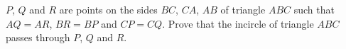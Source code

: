 $P$, $Q$ and $R$ are points on the sides $BC$, $CA$, $AB$ of triangle $ABC$ such that $AQ=AR$, $BR=BP$ and $CP=CQ$. Prove that the incircle of triangle $ABC$ passes through $P$, $Q$ and $R$.
